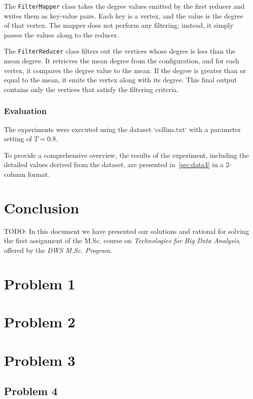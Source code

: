 \documentclass[acmlarge]{acmart}
\begin{document}
The \texttt{FilterMapper} class takes the degree values emitted by the first reducer and writes them as key-value pairs.
Each key is a vertex, and the value is the degree of that vertex.
The mapper does not perform any filtering; instead, it simply passes the values along to the reducer.

The \texttt{FilterReducer} class filters out the vertices whose degree is less than the mean degree.
It retrieves the mean degree from the configuration, and for each vertex, it compares the degree value to the mean.
If the degree is greater than or equal to the mean, it emits the vertex along with its degree.
This final output contains only the vertices that satisfy the filtering criteria.

\subsubsection{Evaluation}
The experiments were executed using the dataset `collins.txt` with a parameter setting of \( T = 0.8 \).

To provide a comprehensive overview, the results of the experiment, including the detailed values derived from the
dataset, are presented in~\autoref{sec:data4} in a 2-column format.



\section{Conclusion}
\label{sec:conclusion}
TODO: In this document we have presented our solutions and rational for solving the first assignment of the M.Sc.
course
on \emph{Technologies for Big Data Analysis}, offered by the \emph{DWS M.Sc. Program}.

\appendix
\section{Problem 1}
\label{sec:data1}


\section{Problem 2}
\label{sec:data2}


\section{Problem 3}
\label{sec:data3}


\subsection{Problem 4}
\label{sec:data4}

\end{document}
